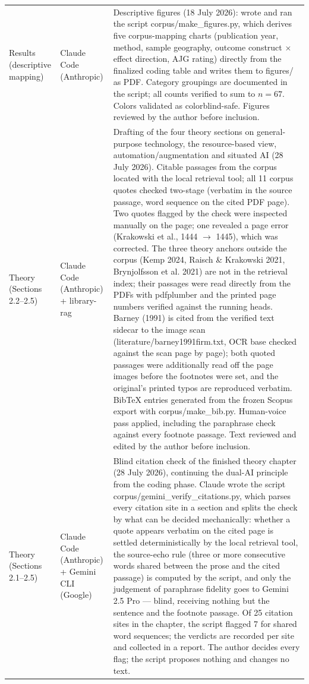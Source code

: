 \begin{longtable}{@{}p{2.9cm}p{3.2cm}p{9.0cm}@{}}
\addlinespace
Results (descriptive mapping) & Claude Code (Anthropic) & Descriptive figures (18 July 2026): wrote and ran the script corpus/make\_figures.py, which derives five corpus-mapping charts (publication year, method, sample geography, outcome construct $\times$ effect direction, AJG rating) directly from the finalized coding table and writes them to figures/ as PDF. Category groupings are documented in the script; all counts verified to sum to $n = 67$. Colors validated as colorblind-safe. Figures reviewed by the author before inclusion. \\
\addlinespace
Theory (Sections 2.2--2.5) & Claude Code (Anthropic) + library-rag & Drafting of the four theory sections on general-purpose technology, the resource-based view, automation/augmentation and situated AI (28 July 2026). Citable passages from the corpus located with the local retrieval tool; all 11 corpus quotes checked two-stage (verbatim in the source passage, word sequence on the cited PDF page). Two quotes flagged by the check were inspected manually on the page; one revealed a page error (Krakowski et al., 1444 $\rightarrow$ 1445), which was corrected. The three theory anchors outside the corpus (Kemp 2024, Raisch \& Krakowski 2021, Brynjolfsson et al. 2021) are not in the retrieval index; their passages were read directly from the PDFs with pdfplumber and the printed page numbers verified against the running heads. Barney (1991) is cited from the verified text sidecar to the image scan (literature/barney1991firm.txt, OCR base checked against the scan page by page); both quoted passages were additionally read off the page images before the footnotes were set, and the original's printed typos are reproduced verbatim. BibTeX entries generated from the frozen Scopus export with corpus/make\_bib.py. Human-voice pass applied, including the paraphrase check against every footnote passage. Text reviewed and edited by the author before inclusion. \\
\addlinespace
Theory (Sections 2.1--2.5) & Claude Code (Anthropic) + Gemini CLI (Google) & Blind citation check of the finished theory chapter (28 July 2026), continuing the dual-AI principle from the coding phase. Claude wrote the script corpus/gemini\_verify\_citations.py, which parses every citation site in a section and splits the check by what can be decided mechanically: whether a quote appears verbatim on the cited page is settled deterministically by the local retrieval tool, the source-echo rule (three or more consecutive words shared between the prose and the cited passage) is computed by the script, and only the judgement of paraphrase fidelity goes to Gemini 2.5 Pro --- blind, receiving nothing but the sentence and the footnote passage. Of 25 citation sites in the chapter, the script flagged 7 for shared word sequences; the verdicts are recorded per site and collected in a report. The author decides every flag; the script proposes nothing and changes no text. \\

\end{longtable}
